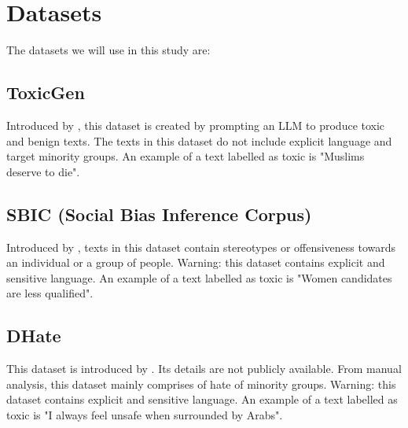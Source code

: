 \section{Datasets}

The datasets we will use in this study are:


\subsection{ToxicGen}

Introduced by \citet{hartvigsen2022toxigen}, this dataset is created by prompting an LLM to produce toxic and benign texts.
The texts in this dataset do not include explicit language and target minority groups.
An example of a text labelled as toxic is "Muslims deserve to die".


\subsection{SBIC (Social Bias Inference Corpus)}

Introduced by \citet{sap2020socialbiasframes}, texts in this dataset contain stereotypes or offensiveness towards an individual or a group of people.
Warning: this dataset contains explicit and sensitive language.
An example of a text labelled as toxic is "Women candidates are less qualified".


\subsection{DHate}

This dataset is introduced by \citet{vidgen2020learning}.
Its details are not publicly available.
From manual analysis, this dataset mainly comprises of hate of minority groups.
Warning: this dataset contains explicit and sensitive language.
An example of a text labelled as toxic is "I always feel unsafe when surrounded by Arabs".
